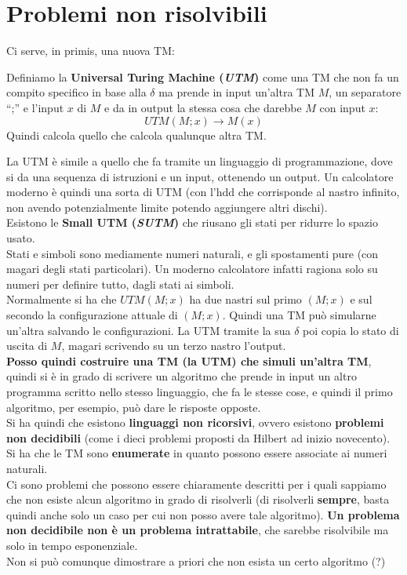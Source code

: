 \documentclass[a4paper,12pt, oneside]{book}
\begin{document}
\section{Problemi non risolvibili}
Ci serve, in primis, una nuova TM:
\begin{definizione}
  Definiamo la \textbf{Universal Turing Machine (\textit{UTM})} come una TM che
  non fa un compito specifico in base alla $\delta$ ma prende in input un'altra
  TM $M$, un separatore ``;'' e l'input $x$ di $M$ e da in output la stessa cosa
  che darebbe $M$ con input $x$:
  \[UTM(M;x)\to M(x)\]
  Quindi calcola quello che calcola qualunque altra TM.
\end{definizione}
La UTM è simile a quello che fa tramite un linguaggio di programmazione, dove si
da una sequenza di istruzioni e un input, ottenendo un output. Un calcolatore
moderno è quindi una sorta di UTM (con l'hdd che corrisponde al nastro
infinito, non avendo potenzialmente limite potendo aggiungere altri dischi).\\
Esistono le \textbf{Small UTM (\textit{SUTM})} che riusano gli stati per ridurre
lo spazio usato.\\
Stati e simboli sono mediamente numeri naturali, e gli spostamenti pure (con
magari degli stati particolari). Un moderno calcolatore infatti ragiona solo su
numeri per definire tutto, dagli stati ai simboli.\\
Normalmente si ha che $UTM(M;x)$ ha due nastri sul primo $(M;x)$ e sul secondo
la configurazione attuale di $(M;x)$. Quindi una TM può simularne un'altra
salvando le configurazioni. La UTM tramite la sua $\delta$ poi copia lo stato di
uscita di $M$, magari scrivendo su un terzo nastro l'output.\\
\textbf{Posso quindi costruire una TM (la UTM) che simuli un'altra TM}, quindi
si è in grado di scrivere un algoritmo che prende in input un altro programma
scritto nello stesso linguaggio, che fa le stesse cose, e quindi il primo
algoritmo, per esempio, può dare le risposte opposte.\\
Si ha quindi che esistono \textbf{linguaggi non ricorsivi}, ovvero esistono
\textbf{problemi non decidibili} (come i dieci problemi proposti da Hilbert ad
inizio novecento).\\
Si ha che le TM sono \textbf{enumerate} in quanto possono essere associate ai
numeri naturali.\\
Ci sono problemi che possono essere chiaramente descritti per i quali sappiamo
che non esiste alcun algoritmo in grado di risolverli (di risolverli
\textbf{sempre}, basta quindi anche solo un caso per cui non posso avere tale
algoritmo). \textbf{Un problema non decidibile non è un problema intrattabile},
che sarebbe risolvibile ma solo in tempo esponenziale.\\
Non si può comunque dimostrare a priori che non esista un certo algoritmo (?)
\end{document}
